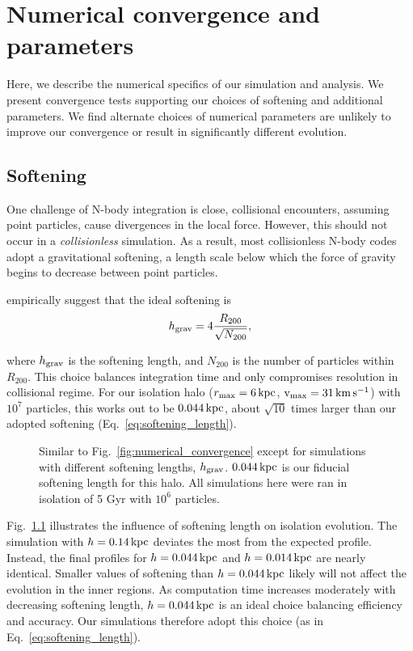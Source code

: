 \chapter{Numerical convergence and
parameters}\label{sec:extra_convergence}

Here, we describe the numerical specifics of our simulation and
analysis. We present convergence tests supporting our choices of
softening and additional parameters. We find alternate choices of
numerical parameters are unlikely to improve our convergence or result
in significantly different evolution.

\section{Softening}\label{softening}

One challenge of N-body integration is close, collisional encounters,
assuming point particles, cause divergences in the local force. However,
this should not occur in a \emph{collisionless} simulation. As a result,
most collisionless N-body codes adopt a gravitational softening, a
length scale below which the force of gravity begins to decrease between
point particles.

\citet{power+2003} empirically suggest that the ideal softening is
\begin{equation}{
h_{\rm grav} = 4 \frac{R_{200}}{\sqrt{N_{200}}},
}\end{equation}

where \(h_{\rm grav}\) is the softening length, and \(N_{200}\) is the
number of particles within \(R_{200}\). This choice balances integration
time and only compromises resolution in collisional regime. For our
isolation halo (\(r_{\rm max}=6\,{\rm kpc}\), \({\rm v}_{\rm max}=31\,{\rm km\,s^{-1}}\)) with \(10^7\)
particles, this works out to be \(0.044\,{\rm kpc}\), about
\(\sqrt{10}\) times larger than our adopted softening
(Eq.~\ref{eq:softening_length}).

\begin{figure}
\centering
{}
\caption[Softening convergence]{Similar to
Fig.~\ref{fig:numerical_convergence} except for simulations with
different softening lengths, \(h_{\rm grav}\). \(0.044\,{\rm kpc}\) is our
fiducial softening length for this halo. All simulations here were ran
in isolation of 5 Gyr with \(10^{6}\)
particles.}\label{fig:softening_convergence}
\end{figure}

Fig.~\ref{fig:softening_convergence} illustrates the influence of
softening length on isolation evolution. The simulation with
\(h=0.14\,{\rm kpc}\) deviates the most from the expected profile. Instead,
the final profiles for \(h=0.044\,{\rm kpc}\) and \(h=0.014\,{\rm kpc}\) are
nearly identical. Smaller values of softening than \(h=0.044\,{\rm kpc}\)
likely will not affect the evolution in the inner regions. As
computation time increases moderately with decreasing softening length,
\(h=0.044\,{\rm kpc}\) is an ideal choice balancing efficiency and accuracy.
Our simulations therefore adopt this choice (as in
Eq.~\ref{eq:softening_length}).

